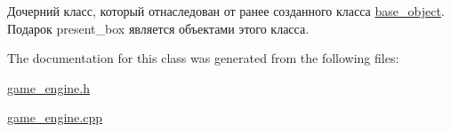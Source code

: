 Дочерний класс, который отнаследован от ранее созданного класса \mbox{\hyperlink{classbase__object}{base\+\_\+object}}. Подарок present\+\_\+box является объектами этого класса. 

The documentation for this class was generated from the following files\+:\begin{DoxyCompactItemize}
\item 
\mbox{\hyperlink{game__engine_8h}{game\+\_\+engine.\+h}}\item 
\mbox{\hyperlink{game__engine_8cpp}{game\+\_\+engine.\+cpp}}\end{DoxyCompactItemize}
